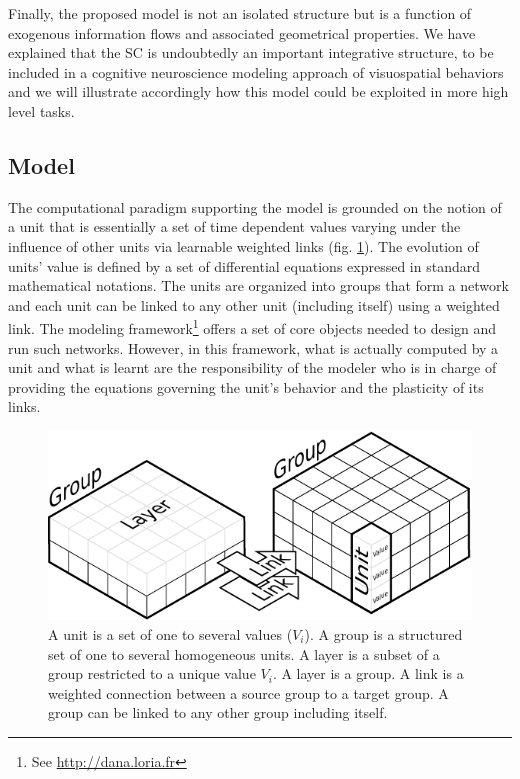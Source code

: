 Finally, the proposed model is not an isolated structure but is a function of
exogenous information flows and associated geometrical properties.  We have
explained that the SC is undoubtedly an important integrative structure, to be
included in a cognitive neuroscience modeling approach of visuospatial
behaviors and we will illustrate accordingly how this model could be exploited
in more high level tasks.



\subsection{Model}
The computational paradigm supporting the model is grounded on the
notion of a unit that is essentially a set of time dependent values
varying under the influence of other units via learnable weighted
links (fig. \ref{fig:group}).  The evolution of units' value is
defined by a set of differential equations expressed in standard
mathematical notations. The units are organized into groups that form
a network and each unit can be linked to any other unit (including
itself) using a weighted link. The modeling framework\footnote{See
  \url{http://dana.loria.fr}} offers a set of core objects needed to
design and run such networks. However, in this framework, what is
actually computed by a unit and what is learnt are the responsibility
of the modeler who is in charge of providing the equations governing
the unit's behavior and the plasticity of its links.
\begin{figure} %
  \begin{center}
    \includegraphics[width=\textwidth]{Chapitres/PublicationsSample/Chapitre/figures/group}
  \end{center}
  \caption {A unit is a set of one to several values ($V_i$). A group is a
    structured set of one to several homogeneous units. A layer is a subset of
    a group restricted to a unique value $V_i$. A layer is a group. A link is a
    weighted connection between a source group to a target group. A group can
    be linked to any other group including itself.}
  \label{fig:group}
\end{figure}
